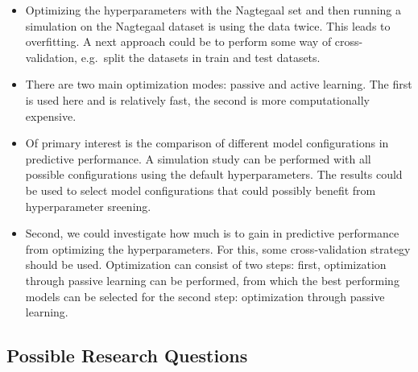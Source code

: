 \documentclass[
]{book}
\begin{document}
\begin{itemize}
\item
  Optimizing the hyperparameters with the Nagtegaal set and then running a simulation on the Nagtegaal dataset is using the data twice.
  This leads to overfitting. A next approach could be to perform some way of cross-validation, e.g.~split the datasets in train and test datasets.
\item
  There are two main optimization modes: passive and active learning.
  The first is used here and is relatively fast, the second is more computationally expensive.
\item
  Of primary interest is the comparison of different model configurations in predictive performance.
  A simulation study can be performed with all possible configurations using the default hyperparameters.
  The results could be used to select model configurations that could possibly benefit from hyperparameter sreening.
\item
  Second, we could investigate how much is to gain in predictive performance from optimizing the hyperparameters.
  For this, some cross-validation strategy should be used.
  Optimization can consist of two steps:
  first, optimization through passive learning can be performed, from which the best performing models can be selected for the second step:
  optimization through passive learning.
\end{itemize}

\hypertarget{possible-research-questions}{%
\subsection{Possible Research Questions}\label{possible-research-questions}}
\end{document}
